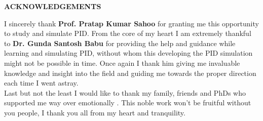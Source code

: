 \begin{center}
{\bf ACKNOWLEDGEMENTS}
\end{center}

I sincerely thank \textbf{Prof. Pratap Kumar Sahoo} for granting me this opportunity to study
and simulate PID. 
From the core of my heart I am extremely thankful to \textbf{Dr. Gunda Santosh Babu} for providing the help and guidance while learning and simulating PID, without whom this developing the PID simulation might not be possible in  time.  Once again I thank him giving me invaluable knowledge and insight into the field and guiding me towards the proper direction each time I went astray.\\
Last but not the least I would like to thank my family, friends and PhDs who supported me way over emotionally . This noble work won't be fruitful without you people, I thank you all from my heart and tranquility.
